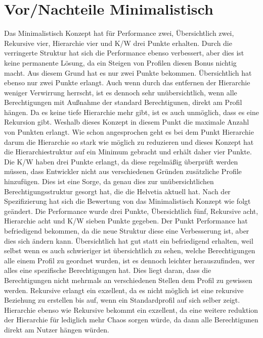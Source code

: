 \section{Vor/Nachteile Minimalistisch}
\label{sec:chapter05:Minimalistisch}
Das Minimalistisch Konzept hat für Performance zwei, Übersichtlich zwei, Rekursive vier, Hierarchie vier und \ac{K/W} drei Punkte erhalten.
Durch die verringerte Struktur hat sich die Performance ebenso verbessert, aber dies ist keine permanente Lösung, da ein Steigen von Profilen diesen Bonus nichtig macht.
Aus diesem Grund hat es nur zwei Punkte bekommen.
Übersichtlich hat ebenso nur zwei Punkte erlangt.
Auch wenn durch das entfernen der Hierarchie weniger Verwirrung herrscht, ist es dennoch sehr unübersichtlich, wenn alle Berechtigungen mit Außnahme der standard Berechtigunen, direkt am Profil hängen.
Da es keine tiefe Hierarchie mehr gibt, ist es auch unmöglich, dass es eine Rekursion gibt.
Weshalb dieses Konzept in diesem Punkt die maximale Anzahl von Punkten erlangt.
Wie schon angesprochen geht es bei dem Punkt Hierarchie darum die Hierarchie so stark wie möglich zu reduzieren und dieses Konzept hat die Hierarchiestruktur auf ein Minimum gebracht und erhält daher vier Punkte.
Die \ac{K/W} haben drei Punkte erlangt, da diese regelmäßig überprüft werden müssen, dass Entwickler nicht aus verschiedenen Gründen zusätzliche Profile hinzufügen.
Dies ist eine Sorge, da genau dies zur unübersichtlichen Berechtigungsstruktur gesorgt hat, die die Helvetia aktuell hat.
\newline
\newline
Nach der Spezifizierung hat sich die Bewertung von das Minimalistisch Konzept wie folgt geändert.
Die Performance wurde drei Punkte, Übersichtlich fünf, Rekursive acht, Hierarchie acht und \ac{K/W} sieben Punkte gegeben.
Der Punkt Performance hat befriedigend bekommen, da die neue Struktur diese eine Verbesserung ist, aber dies sich ändern kann.
Übersichtlich hat gut statt ein befriedigend erhalten, weil selbst wenn es auch schwieriger ist übersichtlich zu sehen, welche Berechtigungen alle einem Profil zu geordnet wurden, ist es dennoch leichter herauszufinden, wer alles eine spezifische Berechtigungen hat.
Dies liegt daran, dass die Berechtigungen nicht mehrmals an verschiedenen Stellen dem Profil zu gewissen werden.
Rekursive erlangt ein exzellent, da es nicht möglich ist eine rekursive Beziehung zu erstellen bis auf, wenn ein Standardprofil auf sich selber zeigt.
Hierarchie ebenso wie Rekursive bekommt ein exzellent, da eine weitere reduktion der Hierarchie für lediglich mehr Chaos sorgen würde, da dann alle Berechtigunen direkt am Nutzer hängen würden.
